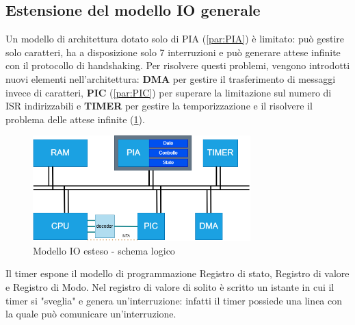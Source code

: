 \subsection{Estensione del modello IO generale}
Un modello di architettura dotato solo di PIA (\ref{par:PIA}) è limitato: può gestire solo caratteri, ha a disposizione solo 7 interruzioni e può generare attese infinite con il protocollo di handshaking.
Per risolvere questi problemi, vengono introdotti nuovi elementi nell'architettura: \textbf{DMA} per gestire il trasferimento di messaggi invece di caratteri, \textbf{PIC} (\ref{par:PIC}) per superare la limitazione sul numero di ISR indirizzabili e \textbf{TIMER} per gestire la temporizzazione e il risolvere il problema delle attese infinite (\ref{img:IO_ESTESO}).

\begin{figure}[h!]
    \centering
    \includegraphics[width=0.75\textwidth]{img/Schema_IO_1.png}
    \caption{Modello IO esteso - schema logico}
    \label{img:IO_ESTESO}
\end{figure}

Il timer espone il modello di programmazione Registro di stato, Registro di valore e Registro di Modo. Nel registro di valore di solito è scritto un istante in cui il timer si "sveglia" e genera un'interruzione: infatti il timer possiede una linea con la quale può comunicare un'interruzione.
